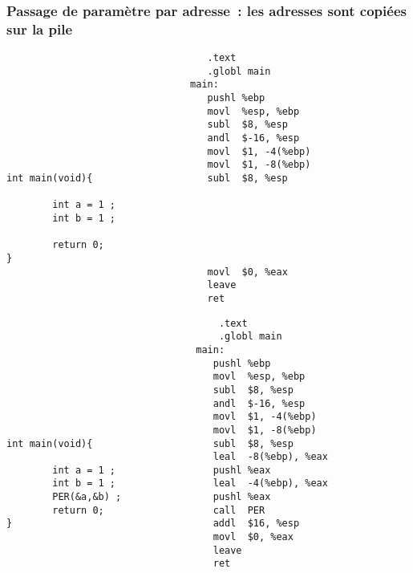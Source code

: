 \begin{frame}[fragile]
  \frametitle{Passage de param\`etre par adresse~: les adresses sont copi\'ees sur la pile}%
\begin{verbatim}
                                   .text                        
                                   .globl main                
                                main:                        
                                   pushl %ebp                
                                   movl  %esp, %ebp        
                                   subl  $8, %esp        
                                   andl  $-16, %esp        
                                   movl  $1, -4(%ebp)        
                                   movl  $1, -8(%ebp)        
int main(void){                    subl  $8, %esp        
                                                         
        int a = 1 ;                                          
        int b = 1 ;                                      
                                                             
        return 0;                                           
}                                  
                                   movl  $0, %eax        
                                   leave                              
                                   ret              
\end{verbatim}    
\end{frame}
\begin{frame}[fragile]
\begin{verbatim}
                                     .text                        
                                     .globl main                
                                 main:                        
                                    pushl %ebp                
                                    movl  %esp, %ebp        
                                    subl  $8, %esp        
                                    andl  $-16, %esp        
                                    movl  $1, -4(%ebp)        
                                    movl  $1, -8(%ebp)        
int main(void){                     subl  $8, %esp        
                                    leal  -8(%ebp), %eax  
        int a = 1 ;                 pushl %eax                
        int b = 1 ;                 leal  -4(%ebp), %eax  
        PER(&a,&b) ;                pushl %eax                
        return 0;                   call  PER                
}                                   addl  $16, %esp        
                                    movl  $0, %eax        
                                    leave                              
                                    ret              
\end{verbatim}    
\end{frame}
